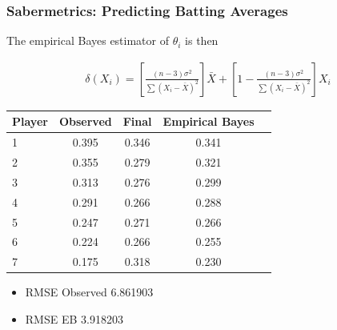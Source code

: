 \documentclass[
  shownotes,
  xcolor={svgnames},
  hyperref={colorlinks,citecolor=DarkBlue,linkcolor=DarkRed,urlcolor=DarkBlue}
  , aspectratio=169]{beamer}
\begin{document}
\begin{frame}[fragile]
\frametitle{Sabermetrics: Predicting Batting Averages}

The empirical Bayes estimator of $\theta_i$ is then
\begin{footnotesize}
  \begin{align}
    \delta(X_i)= \left[ \frac{(n-3)\sigma^2}{\sum(X_i-\bar X)^2}\right] \bar X + \left[ 1- \frac{(n-3)\sigma^2}{\sum(X_i-\bar X)^2}\right] X_i
  \end{align}
\end{footnotesize}


\begin{table}[]
\begin{tabular}{lcccc}
\hline
\hline
Player & Observed & Final & Empirical Bayes  \\
\hline
1      & 0.395    & 0.346 & 0.341            \\
2      & 0.355    & 0.279 & 0.321            \\
3      & 0.313    & 0.276 & 0.299            \\
4      & 0.291    & 0.266 & 0.288            \\
5      & 0.247    & 0.271 & 0.266            \\
6      & 0.224    & 0.266 & 0.255            \\
7      & 0.175    & 0.318 & 0.230           \\
\hline
\hline
\end{tabular}
\end{table}

\begin{itemize}
\item RMSE Observed 6.861903
\item RMSE EB 3.918203
\end{itemize}
\end{frame}
\end{document}
